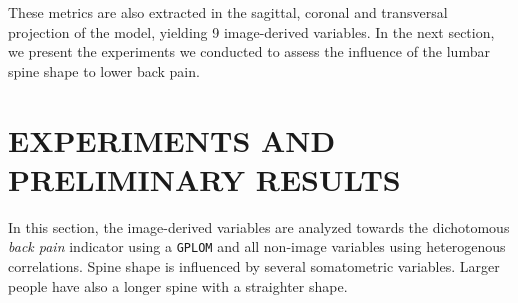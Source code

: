 \documentclass[a4paper,twoside]{style/article}
\begin{document}
These metrics are also extracted in the sagittal, coronal and transversal projection of the model, yielding 9 image-derived variables.
In the next section, we present the experiments we conducted to assess the influence of the lumbar spine shape to lower back pain.
\section{\uppercase{Experiments and Preliminary Results}}
\label{sec:Experiments}
\noindent In this section, the image-derived variables are analyzed towards the dichotomous \emph{back pain} indicator using a \texttt{GPLOM} and all non-image variables using heterogenous correlations.
Spine shape is influenced by several somatometric variables.
Larger people have also a longer spine with a straighter shape.
\end{document}
